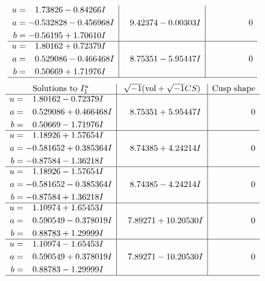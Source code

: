 \documentclass[1p]{elsarticle_modified}
\theoremstyle{definition}
\newcommand{\I}{\sqrt{-1}}
\begin{document}
$$\begin{array}{c|c|c}
\begin{aligned}
u &= \phantom{-}1.73826 - 0.84266 I \\
a &= -0.532828 - 0.456968 I \\
b &= -0.56195 + 1.70610 I\end{aligned}
 & \phantom{-}9.42374 - 0.00303 I & \phantom{-0.000000 } 0 \\ \hline\begin{aligned}
u &= \phantom{-}1.80162 + 0.72379 I \\
a &= \phantom{-}0.529086 - 0.466468 I \\
b &= \phantom{-}0.50669 + 1.71976 I\end{aligned}
 & \phantom{-}8.75351 - 5.95447 I & \phantom{-0.000000 } 0\\
 \hline 
 \end{array}$$\newpage$$\begin{array}{c|c|c}  
\text{Solutions to }I^u_{1}& \I (\text{vol} + \sqrt{-1}CS) & \text{Cusp shape}\\
 \hline 
\begin{aligned}
u &= \phantom{-}1.80162 - 0.72379 I \\
a &= \phantom{-}0.529086 + 0.466468 I \\
b &= \phantom{-}0.50669 - 1.71976 I\end{aligned}
 & \phantom{-}8.75351 + 5.95447 I & \phantom{-0.000000 } 0 \\ \hline\begin{aligned}
u &= \phantom{-}1.18926 + 1.57654 I \\
a &= -0.581652 + 0.385364 I \\
b &= -0.87584 - 1.36218 I\end{aligned}
 & \phantom{-}8.74385 + 4.24214 I & \phantom{-0.000000 } 0 \\ \hline\begin{aligned}
u &= \phantom{-}1.18926 - 1.57654 I \\
a &= -0.581652 - 0.385364 I \\
b &= -0.87584 + 1.36218 I\end{aligned}
 & \phantom{-}8.74385 - 4.24214 I & \phantom{-0.000000 } 0 \\ \hline\begin{aligned}
u &= \phantom{-}1.10974 + 1.65453 I \\
a &= \phantom{-}0.590549 - 0.378019 I \\
b &= \phantom{-}0.88783 + 1.29999 I\end{aligned}
 & \phantom{-}7.89271 + 10.20530 I & \phantom{-0.000000 } 0 \\ \hline\begin{aligned}
u &= \phantom{-}1.10974 - 1.65453 I \\
a &= \phantom{-}0.590549 + 0.378019 I \\
b &= \phantom{-}0.88783 - 1.29999 I\end{aligned}
 & \phantom{-}7.89271 - 10.20530 I & \phantom{-0.000000 } 0\\
 \hline 
 \end{array}$$\newpage\newpage\renewcommand{\arraystretch}{1}
\end{document}
